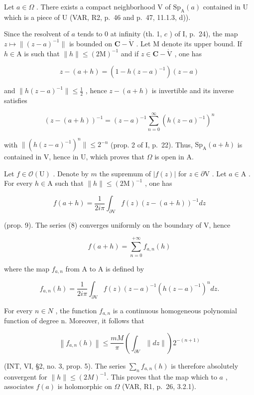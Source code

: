 Let \(a \in \Omega\) . There exists a compact neighborhood V of \(\mathrm{Sp}_{\mathrm{A}}(a)\) contained in U which is a piece of U (VAR, R2, p.~46 and p.~47, 11.1.3, d)).

Since the resolvent of \(a\) tends to 0 at infinity (th. 1, \(c\) ) of I, p.~24), the map \(z \mapsto \| (z - a)^{-1}\|\) is bounded on \(\mathbf{C} - \mathring{\mathrm{V}}\) . Let M denote its upper bound. If \(h \in \mathrm{A}\) is such that \(\| h\| \leqslant (2\mathrm{M})^{-1}\) and if \(z \in \mathbf{C} - \mathring{\mathrm{V}}\) , one has

\[
z - (a + h) = (1 - h (z - a) ^ {- 1}) (z - a)
\]

and \(\|h(z-a)^{-1}\|\leqslant\frac{1}{2}\) , hence \(z-(a+h)\) is invertible and its inverse satisfies

\[
(z - (a + h)) ^ {- 1} = (z - a) ^ {- 1} \sum_ {n = 0} ^ {\infty} (h (z - a) ^ {- 1}) ^ {n}\tag{8}
\]

with \(\| (h(z - a)^{-1})^n\| \leqslant 2^{-n}\) (prop. 2 of I, p.~22). Thus, \(\mathrm{Sp}_{\mathrm{A}}(a + h)\) is contained in V, hence in U, which proves that \(\Omega\) is open in A.

Let \(f \in \mathcal{O}(\mathrm{U})\) . Denote by \(m\) the supremum of \(|f(z)|\) for \(z \in \partial \mathrm{V}\) . Let \(a \in \mathrm{A}\) . For every \(h \in \mathrm{A}\) such that \(\| h \| \leqslant (2\mathrm{M})^{-1}\) , one has

\[
f (a + h) = \frac {1}{2 i \pi} \int_ {\partial \mathrm{V}} f (z) (z - (a + h)) ^ {- 1} d z
\]

(prop. 9). The series (8) converges uniformly on the boundary of V, hence

\[
f (a + h) = \sum_ {n = 0} ^ {+ \infty} f _ {a, n} (h)
\]

where the map \(f_{a,n}\) from A to A is defined by

\[
f _ {a, n} (h) = \frac {1}{2 i \pi} \int_ {\partial \mathrm{V}} f (z) (z - a) ^ {- 1} (h (z - a) ^ {- 1}) ^ {n} d z.
\]

For every \(n \in N\) , the function \(f_{a,n}\) is a continuous homogeneous polynomial function of degree n. Moreover, it follows that

\[
\left\| f _ {a, n} (h) \right\| \leqslant \frac {m M}{\pi} \left(\int_ {\partial V} \| d z \|\right) 2 ^ {- (n + 1)}
\]

(INT, VI, §2, no. 3, prop. 5). The series \(\sum_{n} f_{a,n}(h)\) is therefore absolutely convergent for \(\|h\| \leqslant (2M)^{-1}\). This proves that the map which to \(a\) , associates \(f(a)\) is holomorphic on \(\Omega\) (VAR, R1, p.~26, 3.2.1).

